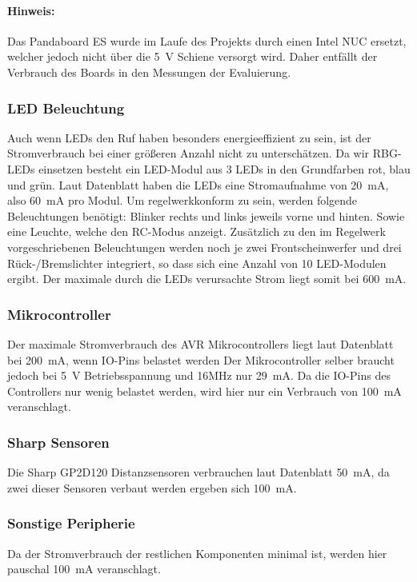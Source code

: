\paragraph{Hinweis:}
Das Pandaboard ES wurde im Laufe des Projekts durch einen Intel NUC ersetzt, welcher jedoch nicht über die \SI{5}{\volt} Schiene versorgt wird.
Daher entfällt der Verbrauch des Boards in den Messungen der Evaluierung.

\subsubsection{LED Beleuchtung}
Auch wenn LEDs den Ruf haben besonders energieeffizient zu sein, ist der Stromverbrauch bei einer größeren Anzahl nicht zu
unterschätzen. Da wir RBG-LEDs einsetzen besteht ein LED-Modul aus 3 LEDs in den Grundfarben rot, blau und grün.
Laut Datenblatt \cite{ds-WS2812} haben die LEDs eine Stromaufnahme von \SI{20}{\milli\ampere}, also \SI{60}{\milli\ampere} pro Modul.
Um regelwerkkonform zu sein, werden folgende Beleuchtungen benötigt: Blinker rechts und links jeweils vorne und hinten.
Sowie eine Leuchte, welche den RC-Modus anzeigt. Zusätzlich zu den im Regelwerk vorgeschriebenen Beleuchtungen werden noch je
zwei Frontscheinwerfer und drei Rück-/Bremslichter integriert, so dass sich eine Anzahl von 10 LED-Modulen ergibt.
Der maximale durch die LEDs verursachte Strom liegt somit bei \SI{600}{\milli\ampere}. 

\subsubsection{Mikrocontroller}
Der maximale Stromverbrauch des AVR Mikrocontrollers liegt laut Datenblatt\cite{ds-at90can} bei \SI{200}{\milli\ampere}, wenn IO-Pins belastet werden
Der Mikrocontroller selber braucht jedoch bei \SI{5}{\volt} Betriebsspannung und 16MHz nur \SI{29}{\milli\ampere}. Da die IO-Pins des Controllers nur wenig belastet werden,
wird hier nur ein Verbrauch von \SI{100}{\milli\ampere} veranschlagt.

\subsubsection{Sharp Sensoren}
Die Sharp GP2D120 Distanzsensoren verbrauchen laut Datenblatt \cite{ds-sharp-GP2D120} \SI{50}{\milli\ampere}, da zwei dieser Sensoren verbaut werden ergeben sich \SI{100}{\milli\ampere}.

\subsubsection{Sonstige Peripherie}
Da der Stromverbrauch der restlichen Komponenten minimal ist, werden hier pauschal \SI{100}{\milli\ampere} veranschlagt.

